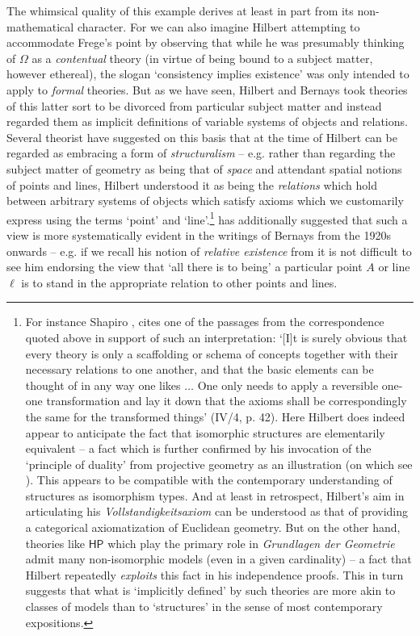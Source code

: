 \documentclass[11pt,fleqn,leqno]{article}
\begin{document}
The whimsical quality of this example derives at least in part from its non-mathematical character.   For we can also imagine Hilbert attempting to accommodate Frege's point by observing that while he was presumably thinking of $\Omega$ as a  \textsl{contentual} theory (in virtue of being bound to a subject matter, however ethereal),  the slogan `consistency implies existence' was only intended to apply to \textsl{formal} theories.  But as we have seen, Hilbert and Bernays took theories of this latter sort to be divorced from particular subject matter and instead regarded them as implicit definitions of variable systems of objects and relations.   Several theorist have suggested on this basis that at the time of \citeyearpar{Hilbert1899} Hilbert can be regarded as embracing a form of \textsl{structuralism} -- e.g. rather than regarding the subject matter of geometry as being that of \textsl{space} and attendant spatial notions  of points and lines, Hilbert understood it as being the \textsl{relations} which hold between arbitrary systems of objects which satisfy axioms which we customarily express using the terms `point' and `line'.\footnote{For instance Shapiro \citeyearpar[p. 162]{Shapiro1997}, \citeyearpar[p. 205]{Shapiro2005} cites one of the passages from the correspondence quoted above in support of such an interpretation: `[I]t is surely obvious that every theory is only a scaffolding or schema of concepts together with their necessary relations to one another, and that the basic elements can be thought of in any way one likes $\ldots$ One only needs to apply a reversible one-one transformation and lay it down that the axioms shall be correspondingly the same for the transformed things' (IV/4, p. 42).  Here Hilbert does indeed appear to anticipate the fact that isomorphic structures are elementarily equivalent -- a fact which is further confirmed by his invocation of the `principle of duality' from projective geometry as an illustration (on which see \citealp{Eder2018}).  This appears to be compatible with the contemporary understanding of structures as isomorphism types.  And at least in retrospect, Hilbert's aim in articulating his \textsl{Vollstandigkeitsaxiom} can be understood as that of providing a categorical axiomatization of Euclidean geometry.    But on the other hand,  theories like $\mathsf{HP}$ which play the primary role in \textsl{Grundlagen der Geometrie} admit many non-isomorphic models (even in a given cardinality) -- a fact that Hilbert repeatedly \textsl{exploits} this fact in his independence proofs.  This in turn suggests that what is `implicitly defined' by such theories are more akin to classes of models than to `structures' in the sense of most contemporary expositions.}  \citet{Parsons2014} has additionally suggested that such a view is more systematically evident in the writings of Bernays from the 1920s onwards -- e.g. if we recall his notion of \textsl{relative existence} from  \citeyearpar{Bernays1950} it is not difficult to see him endorsing the view that `all there is to being' a particular point $A$ or line $\ell$ is to stand in the appropriate relation to other points and lines.
\end{document}

